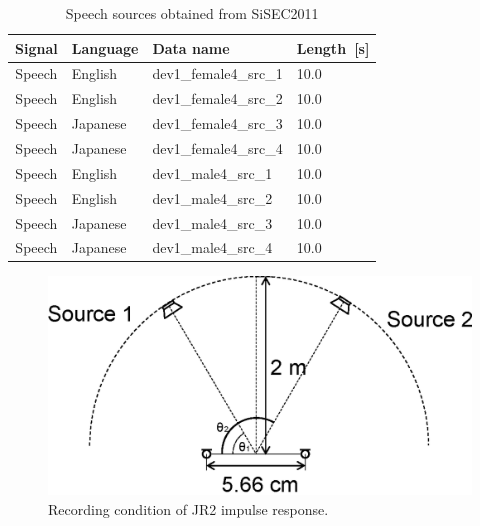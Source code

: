 \begin{table}[t]
\begin{center}
 \caption{Speech sources obtained from SiSEC2011}
 \label{table:wav}
  \begin{tabular}{clll}\hline \hline
   Signal & Language & Data name &Length~[s]  \\ \hline
   Speech & English & dev1\_female4\_src\_1 & 10.0  \\ \hline
   Speech & English & dev1\_female4\_src\_2 &  10.0 \\ \hline
   Speech & Japanese & dev1\_female4\_src\_3 & 10.0  \\ \hline
   Speech & Japanese & dev1\_female4\_src\_4 &  10.0 \\ \hline
   Speech & English & dev1\_male4\_src\_1 & 10.0  \\ \hline
   Speech & English & dev1\_male4\_src\_2 &  10.0 \\ \hline
   Speech & Japanese & dev1\_male4\_src\_3 & 10.0  \\ \hline
   Speech & Japanese & dev1\_male4\_src\_4 &  10.0 \\ \hline
   \hline
  \end{tabular}
 \end{center}
\end{table}
\begin{figure}[t]
     \vspace{8pt}
    \begin{center}
        \includegraphics[width=0.8\columnwidth]{figures/mic}
    \end{center}
    \vspace{-8pt}
	\caption{Recording condition of JR2 impulse response.}
	\label{fig:mic}
\end{figure}
